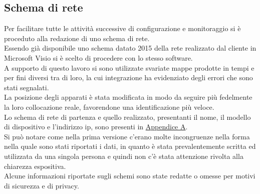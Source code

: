 \documentclass[Realizzazione.tex]{subfiles}
\begin{document}
\subsection{Schema di rete}
Per facilitare tutte le attività successive di configurazione e monitoraggio si è proceduto alla redazione di uno schema di rete. \\
Essendo già disponibile uno schema datato 2015 della rete realizzato dal cliente in Microsoft Visio si è scelto di procedere con lo stesso software. \\
A supporto di questo lavoro si sono utilizzate svariate mappe prodotte in tempi e per fini diversi tra di loro, la cui integrazione ha evidenziato degli errori che sono stati segnalati. \\
La posizione degli apparati è stata modificata in modo da seguire più fedelmente la loro collocazione reale, favorendone una identificazione più veloce. \\
Lo schema di rete di partenza e quello realizzato, presentanti il nome, il modello di dispositivo e l'indirizzo ip, sono presenti in \hyperref[sec:Appendice A]{Appendice A}.\\
Si può notare come nella prima versione c'erano molte incongruenze nella forma nella quale sono stati riportati i dati, in quanto è stata prevalentemente scritta ed utilizzata da una singola persona e quindi non c'è stata attenzione rivolta alla chiarezza espositiva. \\
Alcune informazioni riportate sugli schemi sono state redatte o omesse per motivi di sicurezza e di privacy. \\
\end{document}
